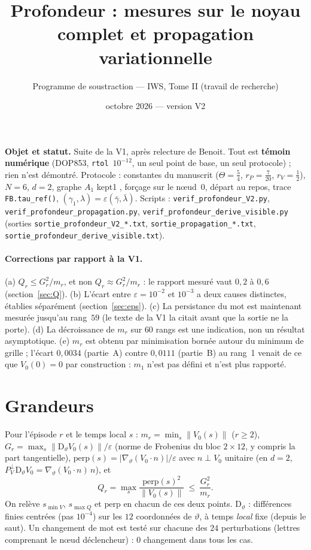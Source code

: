 \documentclass[11pt,a4paper]{article}
\title{Profondeur : mesures sur le noyau complet et propagation variationnelle}
\author{Programme de soustraction --- IWS, Tome II (travail de recherche)}
\date{octobre 2026 --- version V2}
\theoremstyle{remark}
\newcommand{\norm}[1]{\lVert #1\rVert}
\newcommand{\vth}{\vartheta}
\newcommand{\D}{\mathrm D}
\begin{document}
\maketitle

\noindent\textbf{Objet et statut.} Suite de la V1, apr\`es relecture de Benoit. Tout est \textbf{t\'emoin num\'erique} (DOP853, \texttt{rtol}~$10^{-12}$, un seul point de base, un seul protocole) ; rien n'est d\'emontr\'e. Protocole : constantes du manuscrit ($\Theta=\frac54$, $r_P=\frac7{20}$, $r_V=\frac12$), $N=6$, $d=2$, graphe $A_1$ \og kept1 \fg, for\c{c}age sur le n\oe ud~0, d\'epart au repos, trace \texttt{FB.tau\_ref()}, $(\gamma_1,\lambda)=\varepsilon(\bar\gamma,\bar\lambda)$. Scripts : \texttt{verif\_profondeur\_V2.py}, \texttt{verif\_profondeur\_propagation.py}, \texttt{verif\_profondeur\_derive\_visible.py} (sorties \texttt{sortie\_profondeur\_V2\_*.txt}, \texttt{sortie\_propagation\_*.txt}, \texttt{sortie\_profondeur\_derive\_visible.txt}).

\paragraph{Corrections par rapport \`a la V1.}
(a) $Q_r\le G_r^2/m_r$, et non $Q_r\approx G_r^2/m_r$ : le rapport mesur\'e vaut $0{,}2$ \`a $0{,}6$ (section~\ref{sec:Q}). (b) L'\'ecart entre $\varepsilon=10^{-2}$ et $10^{-3}$ a deux causes distinctes, \'etablies s\'epar\'ement (section~\ref{sec:eps}). (c) La persistance du mot est maintenant mesur\'ee jusqu'au rang~$59$ (le texte de la V1 la citait avant que la sortie ne la porte). (d) La d\'ecroissance de $m_r$ sur $60$ rangs est une indication, non un r\'esultat asymptotique. (e) $m_r$ est obtenu par minimisation born\'ee autour du minimum de grille ; l'\'ecart $0{,}0034$ (partie~A) contre $0{,}0111$ (partie~B) au rang~1 venait de ce que $V_0(0)=0$ par construction : $m_1$ n'est pas d\'efini et n'est plus rapport\'e.

\section{Grandeurs}
Pour l'\'episode $r$ et le temps local $s$ : $m_r=\min_s\norm{V_0(s)}$ ($r\ge2$), $G_r=\max_s\norm{\D_\vth V_0(s)}/\varepsilon$ (norme de Frobenius du bloc $2\times12$, y compris la part tangentielle), $\mathrm{perp}(s)=\lvert\nabla_\vth(V_0\!\cdot n)\rvert/\varepsilon$ avec $n\perp V_0$ unitaire (en $d=2$, $P^\perp_V\D_\vth V_0=\nabla_\vth(V_0\!\cdot n)\,n$), et
\[
Q_r=\max_s\frac{\mathrm{perp}(s)^2}{\norm{V_0(s)}}\ \le\ \frac{G_r^2}{m_r}.
\]
On relève $s_{\min V}$, $s_{\max Q}$ et $\mathrm{perp}$ en chacun de ces deux points. $\D_\vth$ : diff\'erences finies centr\'ees (pas $10^{-4}$) sur les $12$ coordonn\'ees de $\vth$, \`a temps \emph{local} fixe (depuis le saut). Un changement de mot est test\'e sur chacune des $24$ perturbations (lettres comprenant le n\oe ud d\'eclencheur) : $0$ changement dans tous les cas.
\end{document}
